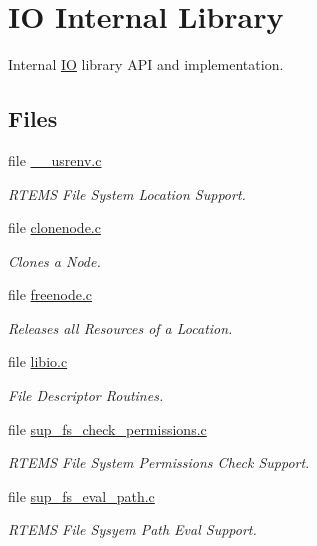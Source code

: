 \hypertarget{group__LibIOInternal}{}\section{IO Internal Library}
\label{group__LibIOInternal}


Internal \mbox{\hyperlink{structIO}{IO}} library A\+PI and implementation.  


\subsection*{Files}
\begin{DoxyCompactItemize}
\item 
file \mbox{\hyperlink{____usrenv_8c}{\+\_\+\+\_\+usrenv.\+c}}
\begin{DoxyCompactList}\small\item\em R\+T\+E\+MS File System Location Support. \end{DoxyCompactList}\item 
file \mbox{\hyperlink{clonenode_8c}{clonenode.\+c}}
\begin{DoxyCompactList}\small\item\em Clones a Node. \end{DoxyCompactList}\item 
file \mbox{\hyperlink{freenode_8c}{freenode.\+c}}
\begin{DoxyCompactList}\small\item\em Releases all Resources of a Location. \end{DoxyCompactList}\item 
file \mbox{\hyperlink{libio_8c}{libio.\+c}}
\begin{DoxyCompactList}\small\item\em File Descriptor Routines. \end{DoxyCompactList}\item 
file \mbox{\hyperlink{sup__fs__check__permissions_8c}{sup\+\_\+fs\+\_\+check\+\_\+permissions.\+c}}
\begin{DoxyCompactList}\small\item\em R\+T\+E\+MS File System Permissions Check Support. \end{DoxyCompactList}\item 
file \mbox{\hyperlink{sup__fs__eval__path_8c}{sup\+\_\+fs\+\_\+eval\+\_\+path.\+c}}
\begin{DoxyCompactList}\small\item\em R\+T\+E\+MS File Sysyem Path Eval Support. \end{DoxyCompactList}\item 

\end{DoxyCompactItemize}
